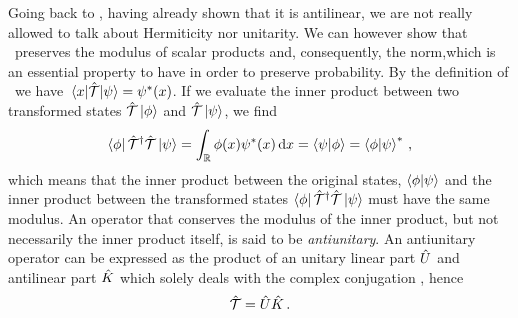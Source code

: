         Going back to \hT, having already shown that it is antilinear, we are not really allowed to talk about Hermiticity nor unitarity. We can however show that \hT\ preserves the modulus of scalar products and, consequently, the norm,which is an essential property to have in order to preserve probability. By the definition of \hT\ we have $\mel{x}{\hT}{\psi} = \psi^*\pqty{x}$. If we evaluate the inner product between two transformed states $\mathcal{\hat{T}}\ket{\phi}$ and $\mathcal{\hat{T}}\ket{\psi}$, we find
        \begin{equation*}
            \bra{\phi}\hT^\dag\hT\ket{\psi}
            = \int\nolimits_\bbR \phi\pqty{x}\psi^*\pqty{x}\dd{x}
            = \bra{\psi}\ket{\phi}
            = \bra{\phi}\ket{\psi}^*
            \mycomma
        \end{equation*}
        which means that the inner product between the original states, $\braket{\phi}{\psi}$ and the inner product between the transformed states $\bra{\phi}\mathcal{\hat{T}}^\dag\mathcal{\hat{T}}\ket{\psi}$ must have the same modulus. An operator that conserves the modulus of the inner product, but not necessarily the inner product itself, is said to be \emph{antiunitary}. An antiunitary operator can be expressed as the product of an unitary linear part $\hat{U}$ and antilinear part $\hat{K}$ which solely deals with the complex conjugation \cite{Sakurai2020-pu}, hence
        \begin{equation}
            \label{eq:antiunitary-operator}
            \mathcal{\hat{T}} = \hat{U}\hat{K}
            \,\text{.}
        \end{equation}
        
